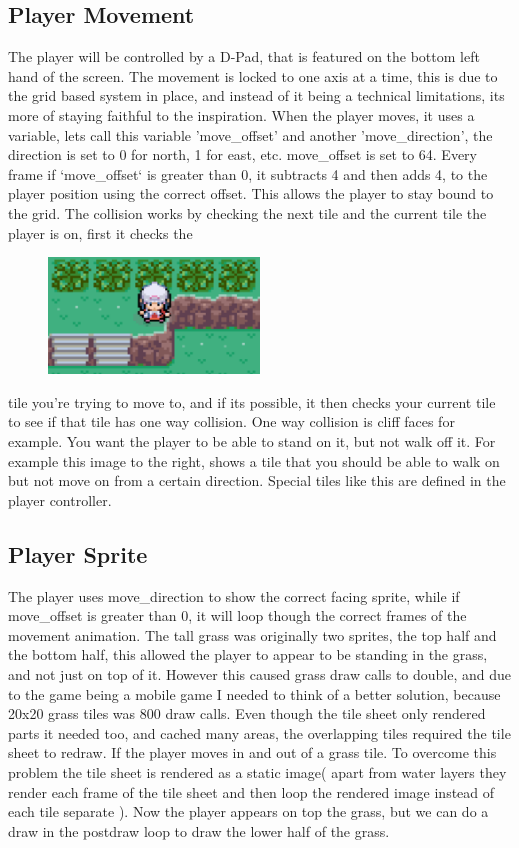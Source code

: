 \documentclass[11pt,a4paper]{article}
\begin{document}
\subsection{Player Movement}
The player will be controlled by a D-Pad, that is featured on the bottom left hand of the screen. The movement is locked to one axis at a time, this is due to the grid based system in place, and instead of it being a technical limitations, its more of staying faithful to the inspiration. When the player moves, it uses a variable, lets call this variable 'move\_offset' and another 'move\_direction', the direction is set to 0 for north, 1 for east, etc. move\_offset is set to 64. Every frame if `move\_offset` is greater than 0, it subtracts 4 and then adds 4, to the player position using the correct offset. This allows the player to stay bound to the grid. The collision works by checking the next tile and the current tile the player is on, first it checks the\begin{figure}
\begin{center}\includegraphics[width=0.5\textwidth,trim ]{Capture.PNG}\end{center}\end{figure} tile you're trying to move to, and if its possible, it then checks your current tile to see if that tile has one way collision. One way collision is cliff faces for example. You want the player to be able to stand on it, but not walk off it. For example this image to the right, shows a tile that you should be able to walk on but not move on from a certain direction. Special tiles like this are defined in the player controller.


\subsection{Player Sprite}
The player uses move\_direction to show the correct facing sprite, while if move\_offset is greater than 0, it will loop though the correct frames of the movement animation. The tall grass was originally two sprites, the top half and the bottom half, this allowed the player to appear to be standing in the grass, and not just on top of it. However this caused grass draw calls to double, and due to the game being a mobile game I needed to think of a better solution, because 20x20 grass tiles was 800 draw calls. Even though the tile sheet only rendered parts it needed too, and cached many areas, the overlapping tiles required the tile sheet to redraw. If the player moves in and out of a grass tile. To overcome this problem the tile sheet is rendered as a static image( apart from water layers they render each frame of the tile sheet and then loop the rendered image instead of each tile separate ). Now the player appears on top the grass, but we can do a draw in the postdraw loop to draw the lower half of the grass.
\end{document}
